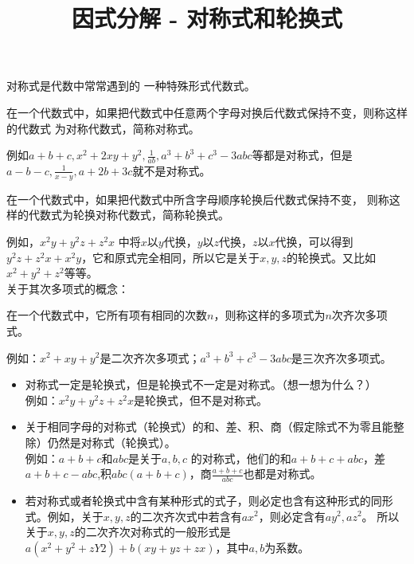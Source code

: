 \documentclass[windows,csize4,answers]{BHCexam}
\title{因式分解 - 对称式和轮换式}
\begin{document}
\maketitle

\begin{groups}
    对称式是代数中常常遇到的 一种特殊形式代数式。\\
    \fbox
    {
        \parbox{\textwidth}
        {
            在一个代数式中，如果把代数式中任意两个字母对换后代数式保持不变，则称这样的代数式
            为对称代数式，简称对称式。
        }
    }
    例如$a+b+c,x^2+2xy+y^2,\frac{1}{ab},a^3+b^3+c^3-3abc$等都是对称式，但是
    $a-b-c,\frac{1}{x-y},a+2b+3c$就不是对称式。 \\

    \fbox
    {
        \parbox{\textwidth}
        {
            在一个代数式中，如果把代数式中所含字母顺序轮换后代数式保持不变，
            则称这样的代数式为轮换对称代数式，简称轮换式。
        }
    }
    例如，$x^2y+y^2z+z^2x$ 中将$x$以$y$代换，$y$以$z$代换，$z$以$x$代换，可以得到
    $y^2z+z^2x+x^2y$，它和原式完全相同，所以它是关于$x,y,z$的轮换式。又比如$x^2+y^2+z^2$等等。 \\

    关于其次多项式的概念： \\
    \fbox
    {
        \parbox{\textwidth}
        {
            在一个代数式中，它所有项有相同的次数$n$，则称这样的多项式为$n$次齐次多项式。
        }
    }
    例如：$x^2+xy+y^2$是二次齐次多项式；$a^3+b^3+c^3-3abc$是三次齐次多项式。


    \begin{itemize}
        \item 对称式一定是轮换式，但是轮换式不一定是对称式。（想一想为什么？）\\
              例如：$x^2y+y^2z+z^2x$是轮换式，但不是对称式。
        \item 关于相同字母的对称式（轮换式）的和、差、积、商（假定除式不为零且能整除）仍然是对称式（轮换式）。\\
              例如：$a+b+c$和$abc$是关于$a,b,c$ 的对称式，他们的和$a+b+c+abc$，差$a+b+c-abc$,积$abc(a+b+c)$，商$\frac{a+b+c}{abc}$也都是对称式。
        \item 若对称式或者轮换式中含有某种形式的式子，则必定也含有这种形式的同形式。例如，关于$x,y,z$的二次齐次式中若含有$ax^2$，则必定含有$ay^2,az^2$。
              所以关于$x,y,z$的二次齐次对称式的一般形式是$a(x^2+y^2+zY2)+b(xy+yz+zx)$，其中$a,b$为系数。
    \end{itemize}


\end{groups}
\end{document}
